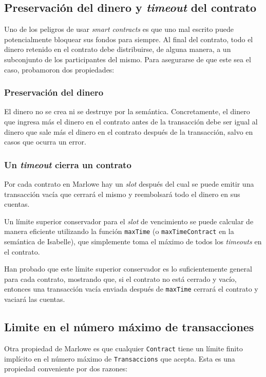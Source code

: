 \documentclass[12pt]{book}
\begin{document}
\subsection{Preservación del dinero y \textit{timeout} del contrato}

Uno de los peligros de usar \textit{smart contracts} es que uno mal escrito puede potencialmente bloquear sus fondos para siempre. Al final del contrato, todo el dinero retenido en el contrato debe distribuirse, de alguna manera, a un subconjunto de los participantes del mismo. Para asegurarse de que este sea el caso, probamoron dos propiedades:

\subsubsection{Preservación del dinero}
El dinero no se crea ni se destruye por la semántica. Concretamente, el dinero que ingresa más el dinero en el contrato antes de la transacción debe ser igual al dinero que sale más el dinero en el contrato después de la transacción, salvo en casos que ocurra un error.

\subsubsection{Un \textit{timeout} cierra un contrato} 
Por cada contrato en Marlowe hay un \textit{slot} después del cual se puede emitir una transacción vacía que cerrará el mismo y reembolsará todo el dinero en sus cuentas.

Un límite superior conservador para el \textit{slot} de vencimiento se puede calcular de manera eficiente utilizando la función \texttt{maxTime} (o \texttt{maxTimeContract} en la semántica de Isabelle), que simplemente toma el máximo de todos los \textit{timeouts} en el contrato.

Han probado que este límite superior conservador es lo suficientemente general para cada contrato, mostrando que, si el contrato no está cerrado y vacío, entonces una transacción vacía enviada después de \texttt{maxTime} cerrará el contrato y vaciará las cuentas.

\subsection{Limite en el número máximo de transacciones}

Otra propiedad de Marlowe es que cualquier \texttt{Contract} tiene un límite finito implícito en el número máximo de \texttt{Transaccions} que acepta. Esta es una propiedad conveniente por dos razones:
\end{document}
